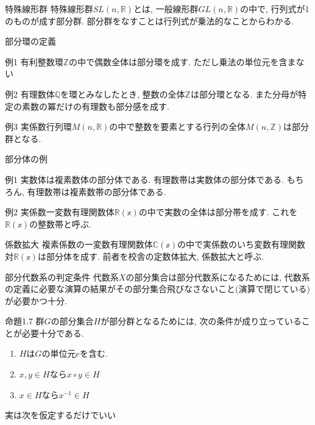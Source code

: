 \documentclass[dvipdfmx,11pt,notheorems]{beamer}
\begin{document}
\begin{frame}
  \begin{exampleblock}{特殊線形群}
    特殊線形群$SL(n, \mathbb{R})$とは, 一般線形群$GL(n, \mathbb{R})$の中で, 行列式が1のものが成す部分群. 部分群をなすことは行列式が乗法的なことからわかる.
  \end{exampleblock}
\end{frame}

\begin{frame}{部分環の定義}
  \begin{exampleblock}{例1}
   有利整数環$\mathbb{Z}$の中で偶数全体は部分環を成す. ただし乗法の単位元を含まない
  \end{exampleblock}

  \begin{exampleblock}{例2}
    有理数体$\mathbb{Q}$を環とみなしたとき, 整数の全体$\mathbb{Z}$は部分環となる. また分母が特定の素数の冪だけの有理数も部分感を成す.
   \end{exampleblock}

   \begin{exampleblock}{例3}
    実係数行列環$M(n, \mathbb{R})$の中で整数を要素とする行列の全体$M(n, \mathbb{Z})$は部分群となる.
   \end{exampleblock}
\end{frame}

\begin{frame}{部分体の例}
  \begin{exampleblock}{例1}
    実数体は複素数体の部分体である. 有理数帯は実数体の部分体である. もちろん, 有理数帯は複素数帯の部分体である.
   \end{exampleblock}
 
   \begin{exampleblock}{例2}
     実係数一変数有理関数体$\mathbb{R(x)}$の中で実数の全体は部分帯を成す. これを$\mathbb{R(x)}$の整数帯と呼ぶ.
    \end{exampleblock}
 
    \begin{exampleblock}{係数拡大}
     複素係数の一変数有理関数体$\mathbb{C(x)}$の中で実係数のいち変数有理関数対$\mathbb{R(x)}$は部分体を成す. 前者を校舎の定数体拡大, 係数拡大と呼ぶ.
    \end{exampleblock}
\end{frame}

\begin{frame}{部分代数系の判定条件}
  代数系$X$の部分集合は部分代数系になるためには, 代数系の定義に必要な演算の結果がその部分集合飛びなさないこと(演算で閉じている)が必要かつ十分.
  \begin{block}{命題1.7}
    群$G$の部分集合$H$が部分群となるためには, 次の条件が成り立っていることが必要十分である.
    \begin{enumerate}
      \item $H$は$G$の単位元$e$を含む.
      \item $x, y \in H$なら$x\circ y \in H$
      \item $x \in H$なら$x^{-1} \in H$
    \end{enumerate}
  \end{block}
  実は次を仮定するだけでいい
\end{frame}
\end{document}
